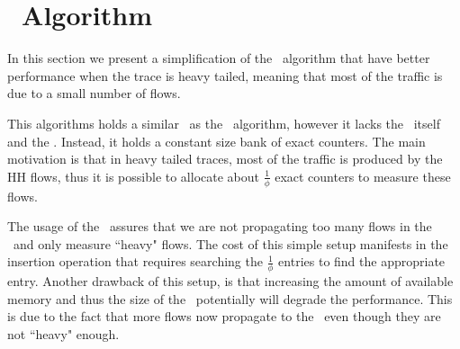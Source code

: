 \section{\eb\ Algorithm}
\label{sec:improvemnts}
In this section we  present a simplification of the \cs\ algorithm that have better performance when the trace is heavy tailed, meaning that most of the traffic is due to a small number of flows.

This algorithms holds a similar \sfa\ as the \cs\ algorithm, however it lacks the \cs\ itself and the \sea. Instead, it holds a constant size bank of exact counters. The main motivation is that in heavy tailed traces, most of the traffic is produced by the HH flows, thus it is possible to allocate about $\frac{1}{\phi}$ exact counters to measure these flows.

The usage of the \sfa\ assures that we are not propagating too many flows in the \eb\ and only measure ``heavy" flows. The cost of this simple setup manifests in the insertion operation that requires searching the $\frac{1}{\phi}$ entries to find the appropriate entry. Another drawback of this setup, is that increasing the amount of available memory and thus the size of the \sfa\ potentially will degrade the performance.  This is due to the fact that more flows now propagate to the \eb\ even though they are not ``heavy" enough.

